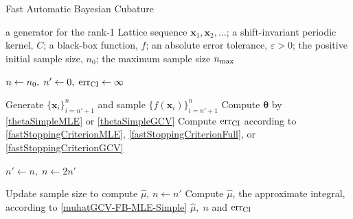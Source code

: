 \documentclass[twocolumn]{svjour3}          %
\newcommand{\bm}[1]{\boldsymbol{#1}}
\newcommand{\vtheta}{{\bm{\theta}}}
\newcommand{\vx}{\bm{x}}
\newcommand{\hmu}{\widehat{\mu}}
\newcommand{\err}{\textup{err}}
\begin{document}
\begin{algorithm}
	\caption{Fast Automatic Bayesian Cubature}\label{algorithm2}
	\begin{algorithmic}[1]
		\Require a generator for the rank-1 Lattice sequence
		$\vx_1, \vx_2, \ldots$; 
		a shift-invariant periodic kernel, $C$;
		a black-box function, $f$; 
		an absolute error tolerance,
		$\varepsilon>0$; the positive initial sample size, $n_0$;
		the maximum sample size $n_{\textup{max}}$
		
		\State $n \gets n_0, \; n' \gets 0, \; \err_{\textup{CI}} \gets \infty$
		
		\While{$\err_{\textup{CI}} > \varepsilon$ and $n \le n_{\textup{max}}$}
		
		\State\label{LoopStart}Generate $\{ \vx_i\}_{i=n' + 1}^{n}$ and sample $\{f(\vx_i)\}_{i=n'+1}^{n}$
		\State Compute $\vtheta$ by \eqref{thetaSimpleMLE} or \eqref{thetaSimpleGCV}
		\State Compute $\err_{\textup{CI}}$  according to \eqref{fastStoppingCriterionMLE}, \eqref{fastStoppingCriterionFull}, or \eqref{fastStoppingCriterionGCV}
		
		\State	$n' \gets n, \; n \gets 2n'$
		
		\EndWhile
		
		\State Update sample size to compute $\hmu$, $n \gets n'$
		\State Compute $\hmu$, the approximate integral,   according to \eqref{muhatGCV-FB-MLE-Simple}
		\State \Return $\hmu, \; n$  and $\err_{\textup{CI}}$
	\end{algorithmic}
\end{algorithm}
\end{document}
